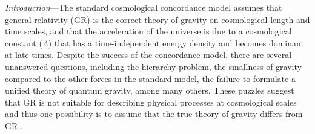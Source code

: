 \documentclass[prd,twocolumn,aps,psfig,nofootinbib,nobibnotes,superscriptaddress,preprintnumbers,times]{revtex4-2}
\begin{document}
\maketitle

\textit{Introduction}---The standard cosmological concordance model assumes that general relativity (GR) is the correct theory of gravity on cosmological length and time scales, and that the acceleration of the universe is due to a cosmological constant ($\Lambda$) that has a time-independent energy density and becomes dominant at late times. 
Despite the success of the concordance model, there are several unanswered questions, including the hierarchy problem, the smallness of gravity compared to the other forces in the standard model, the failure to formulate a unified theory of quantum gravity, among many others. 
These puzzles suggest that GR is not suitable for describing physical processes at cosmological scales and thus one possibility is to assume that the true theory of gravity differs from GR  \cite{Clifton:2011jh, Nojiri:2017ncd, Joyce:2014kja, Planck:2015bue}. 

\end{document}
